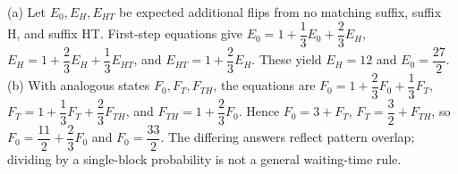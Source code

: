 (a) Let $E_0,E_H,E_{HT}$ be expected additional flips from no matching suffix, suffix H, and suffix HT. First-step equations give $E_0=1+\dfrac{1}{3}E_0+\dfrac{2}{3}E_H$, $E_H=1+\dfrac{2}{3}E_H+\dfrac{1}{3}E_{HT}$, and $E_{HT}=1+\dfrac{2}{3}E_H$. These yield $E_H=12$ and $\boxed{E_0 = \dfrac{27}{2}}$. (b) With analogous states $F_0,F_T,F_{TH}$, the equations are $F_0=1+\dfrac{2}{3}F_0+\dfrac{1}{3}F_T$, $F_T=1+\dfrac{1}{3}F_T+\dfrac{2}{3}F_{TH}$, and $F_{TH}=1+\dfrac{2}{3}F_0$. Hence $F_0=3+F_T$, $F_T=\dfrac{3}{2}+F_{TH}$, so $F_0=\dfrac{11}{2}+\dfrac{2}{3}F_0$ and $\boxed{F_0 = \dfrac{33}{2}}$. The differing answers reflect pattern overlap; dividing by a single-block probability is not a general waiting-time rule.
